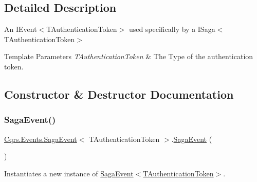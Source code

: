\subsection{Detailed Description}
An I\+Event$<$\+T\+Authentication\+Token$>$ used specifically by a I\+Saga$<$\+T\+Authentication\+Token$>$ 


\begin{DoxyTemplParams}{Template Parameters}
{\em T\+Authentication\+Token} & The Type of the authentication token.\\
\hline
\end{DoxyTemplParams}


\subsection{Constructor \& Destructor Documentation}
\mbox{\label{classCqrs_1_1Events_1_1SagaEvent_a658ce04baccb816bf132702cccaa6a90_a658ce04baccb816bf132702cccaa6a90}} 
\subsubsection{\texorpdfstring{Saga\+Event()}{SagaEvent()}\hspace{0.1cm}{\footnotesize\ttfamily [1/2]}}
{\footnotesize\ttfamily \hyperlink{classCqrs_1_1Events_1_1SagaEvent}{Cqrs.\+Events.\+Saga\+Event}$<$ T\+Authentication\+Token $>$.\hyperlink{classCqrs_1_1Events_1_1SagaEvent}{Saga\+Event} (\begin{DoxyParamCaption}{ }\end{DoxyParamCaption})}



Instantiates a new instance of \hyperlink{classCqrs_1_1Events_1_1SagaEvent_a658ce04baccb816bf132702cccaa6a90_a658ce04baccb816bf132702cccaa6a90}{Saga\+Event$<$\+T\+Authentication\+Token$>$}. 

\mbox{\label{classCqrs_1_1Events_1_1SagaEvent_aeb42f8e8f8e18bffe0dbe55b3da3c476_aeb42f8e8f8e18bffe0dbe55b3da3c476}} 
